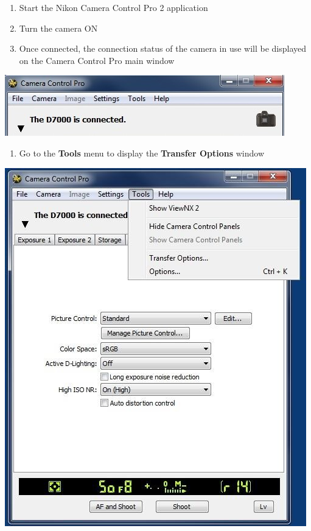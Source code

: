 \documentclass[
]{book}
\providecommand{\tightlist}{%
  \setlength{\itemsep}{0pt}\setlength{\parskip}{0pt}}
\begin{document}
\begin{enumerate}
\def\labelenumi{\arabic{enumi}.}
\setcounter{enumi}{3}
\item
  Start the Nikon Camera Control Pro 2 application
\item
  Turn the camera ON
\item
  Once connected, the connection status of the camera in use will be displayed on the Camera Control Pro main window
\end{enumerate}

\includegraphics{images/Camera10.jpg}

\begin{enumerate}
\def\labelenumi{\arabic{enumi}.}
\setcounter{enumi}{6}
\tightlist
\item
  Go to the \textbf{Tools} menu to display the \textbf{Transfer Options} window
\end{enumerate}

\includegraphics{images/Camera11.jpg}
\end{document}

